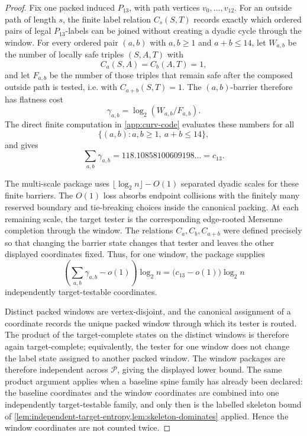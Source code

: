 \documentclass[11pt]{article}
\begin{document}
\begin{proof}
Fix one packed induced \(P_{13}\), with path vertices \(v_0,\ldots,v_{12}\).
For an outside path of length \(s\), the finite label relation \(C_s(S,T)\)
records exactly which ordered pairs of legal \(P_{13}\)-labels can be joined
without creating a dyadic cycle through the window.  For every ordered pair
\((a,b)\) with \(a,b\ge1\) and \(a+b\le14\), let \(W_{a,b}\) be the number of
locally safe triples \((S,A,T)\) with
\[
C_a(S,A)=C_b(A,T)=1,
\]
and let \(F_{a,b}\) be the number of those triples that remain safe after the
composed outside path is tested, i.e. with \(C_{a+b}(S,T)=1\).  The
\((a,b)\)-barrier therefore has flatness cost
\[
\gamma_{a,b}=\log_2(W_{a,b}/F_{a,b}).
\]
The direct finite computation in \cref{app:curv-code} evaluates these numbers
for all
\[
\{(a,b):a,b\ge1,\ a+b\le14\},
\]
and gives
\[
\sum_{a,b}\gamma_{a,b}=118.10858100609198\ldots=c_{13}.
\]

The multi-scale package uses \(\lfloor\log_2 n\rfloor-O(1)\) separated dyadic
scales for these finite barriers.  The \(O(1)\) loss absorbs endpoint
collisions with the finitely many reserved boundary and tie-breaking choices
inside the canonical packing.  At each remaining scale, the target tester is
the corresponding edge-rooted Mersenne completion through the window.  The
relations \(C_a,C_b,C_{a+b}\) were defined precisely so that changing the
barrier state changes that tester and leaves the other displayed coordinates
fixed.  Thus, for one window, the package supplies
\[
\left(\sum_{a,b}\gamma_{a,b}-o(1)\right)\log_2 n
=
\bigl(c_{13}-o(1)\bigr)\log_2 n
\]
independently target-testable coordinates.

Distinct packed windows are vertex-disjoint, and the canonical assignment of a
coordinate records the unique packed window through which its tester is routed.
The product of the target-complete states on the distinct windows is therefore
again target-complete; equivalently, the tester for one window does not change
the label state assigned to another packed window.  The window packages are
therefore independent across \(\mathcal P\), giving the displayed lower bound.
The same product argument applies when a baseline spine family has already been
declared: the baseline coordinates and the window coordinates are combined into
one independently target-testable family, and only then is the labelled
skeleton bound of \cref{lem:independent-target-entropy,lem:skeleton-dominates}
applied.  Hence the window coordinates are not counted twice.
\end{proof}
\end{document}
